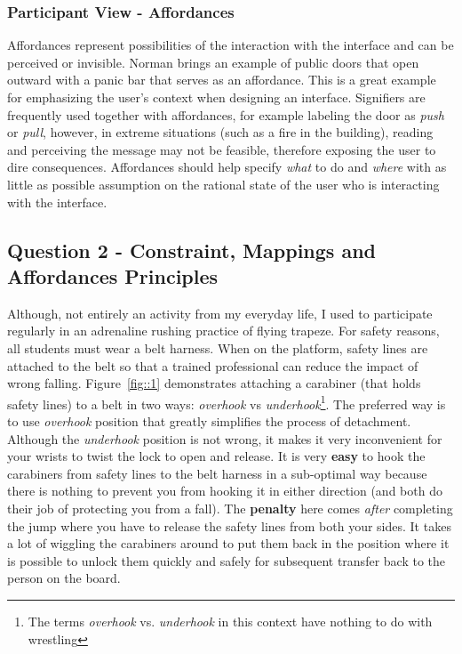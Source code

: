 \documentclass[12pt,letterpaper]{article}
\begin{document}
\subsubsection*{Participant View - Affordances}
Affordances represent possibilities of the interaction with the interface and can be perceived or invisible. Norman brings an example of public doors that open outward with a panic bar that serves as an affordance. This is a great example for emphasizing the user's context when designing an interface. Signifiers are frequently used together with affordances, for example labeling the door as \textit{push} or \textit{pull}, however, in extreme situations (such as a fire in the building), reading and perceiving the message may not be feasible, therefore exposing the user to dire consequences. Affordances should help specify \textit{what} to do and \textit{where} with as little as possible assumption on the rational state of the user who is interacting with the interface. 

\subsection*{Question 2 - Constraint, Mappings and Affordances Principles}

Although, not entirely an activity from my everyday life, I used to participate regularly in an adrenaline rushing practice of flying trapeze. For safety reasons, all students must wear a belt harness. When on the platform, safety lines are attached to the belt so that a trained professional can reduce the impact of wrong falling. Figure~\ref{fig::1} demonstrates attaching a carabiner (that holds safety lines) to a belt in two ways: \textit{overhook} vs \textit{underhook}\footnote{The terms \textit{overhook} vs. \textit{underhook} in this context have nothing to do with wrestling}. The preferred way is to use \textit{overhook} position that greatly simplifies the process of detachment. Although the \textit{underhook} position is not wrong, it makes it very inconvenient for your wrists to twist the lock to open and release. It is very \textbf{easy} to hook the carabiners from safety lines to the belt harness in a sub-optimal way because there is nothing to prevent you from hooking it in either direction (and both do their job of protecting you from a fall). The \textbf{penalty} here comes \textit{after} completing the jump where you have to release the safety lines from both your sides. It takes a lot of wiggling the carabiners around to put them back in the position where it is possible to unlock them quickly and safely for subsequent transfer back to the person on the board.   
\end{document}
